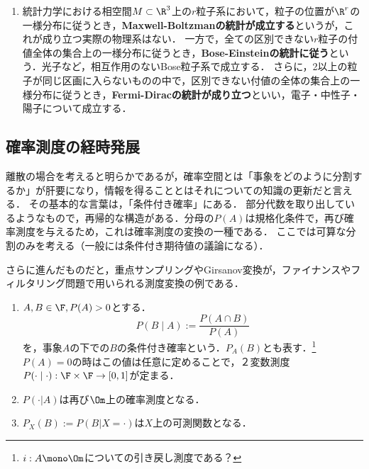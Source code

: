 \documentclass[uplatex,dvipdfmx]{jsreport}
\begin{document}
\begin{example}[時空間のモデルの例]\mbox{}
    \begin{enumerate}
        \item 統計力学における相空間$M\subset\R^3$上の$r$粒子系において，粒子の位置が$\R^r$の一様分布に従うとき，\textbf{Maxwell-Boltzmanの統計が成立する}というが，これが成り立つ実際の物理系はない．
        一方で，全ての区別できない$r$粒子の付値全体の集合上の一様分布に従うとき，\textbf{Bose-Einsteinの統計に従う}という．光子など，相互作用のないBose粒子系で成立する．
        さらに，2以上の粒子が同じ区画に入らないものの中で，区別できない付値の全体の集合上の一様分布に従うとき，\textbf{Fermi-Diracの統計が成り立つ}といい，電子・中性子・陽子について成立する．
    \end{enumerate}
\end{example}

\subsection{確率測度の経時発展}

\begin{tcolorbox}[colframe=ForestGreen, colback=ForestGreen!10!white,breakable,colbacktitle=ForestGreen!40!white,coltitle=black,fonttitle=\bfseries\sffamily,
title=確率空間の万華鏡による拡大]
    離散の場合を考えると明らかであるが，確率空間とは「事象をどのように分割するか」が肝要になり，情報を得ることとはそれについての知識の更新だと言える．
    その基本的な言葉は，「条件付き確率」にある．
    部分代数を取り出しているようなもので，再帰的な構造がある．分母の$P(A)$は規格化条件で，再び確率測度を与えるため，これは確率測度の変換の一種である．
    ここでは可算な分割のみを考える（一般には条件付き期待値の議論になる）．

    さらに進んだものだと，重点サンプリングやGirsanov変換が，ファイナンスやフィルタリング問題で用いられる測度変換の例である．
\end{tcolorbox}

\begin{definition}\label{def-conditional-probability}\mbox{}
    \begin{enumerate}
        \item $A,B\in\F,P(A)>0$とする．
        \[P(B\mid A):=\frac{P(A\cap B)}{P(A)}\]
        を，事象$A$の下での$B$の条件付き確率という．$P_A(B)$とも表す．\footnote{$i:A\mono\Om$についての引き戻し測度である？}
        $P(A)=0$の時はこの値は任意に定めることで，２変数測度$P(\cdot\mid\cdot):\F\times\F\to[0,1]$が定まる．
        \item $P(\cdot|A)$は再び$\Om$上の確率測度となる．
        \item $P_X(B):=P(B|X=\cdot)$は$X$上の可測関数となる．
    \end{enumerate}
\end{definition}
\end{document}
